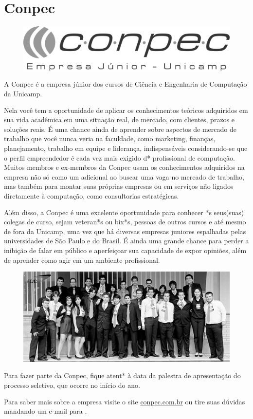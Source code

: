 
\section{Conpec}

\begin{figure}[H]
    \centering
    \includegraphics[width=.35\textwidth]{img/alem_da_graduacao/conpec_logo.png}
\end{figure}

A Conpec é a empresa júnior dos cursos de Ciência e Engenharia de Computação da
Unicamp.

Nela você tem a oportunidade de aplicar os conhecimentos teóricos adquiridos em
sua vida acadêmica em uma situação real, de mercado, com clientes, prazos e
soluções reais. É uma chance ainda de aprender sobre aspectos de mercado de
trabalho que você nunca veria na faculdade, como marketing, finanças,
planejamento, trabalho em equipe e liderança, indispensáveis considerando-se que
o perfil empreendedor é cada vez mais exigido d* profissional de computação.
Muitos membros e ex-membros da Conpec usam os conhecimentos adquiridos na
empresa não só como um adicional ao buscar uma vaga no mercado de trabalho, mas
também para montar suas próprias empresas ou em serviços não ligados diretamente
à computação, como consultorias estratégicas.

Além disso, a Conpec é uma excelente oportunidade para conhecer *s seus(suas) colegas
de curso, sejam veteran*s ou bix*s, pessoas de outros cursos e até mesmo de fora
da Unicamp, uma vez que há diversas empresas juniores espalhadas pelas
universidades de São Paulo e do Brasil. É ainda uma grande chance para perder a
inibição de falar em público e aperfeiçoar sua capacidade de expor opiniões,
além de aprender como agir em um ambiente profissional.

\begin{figure}[H]
    \centering
    \includegraphics[width=.45\textwidth]{img/alem_da_graduacao/conpec_foto.jpg}
\end{figure}

Para fazer parte da Conpec, fique atent* à data da palestra de apresentação do
processo seletivo, que ocorre no início do ano.

Para saber mais sobre a empresa visite o site \url{conpec.com.br} ou tire suas
dúvidas mandando um e-mail para .
